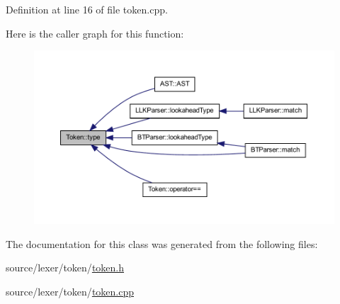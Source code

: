 Definition at line 16 of file token.cpp.



Here is the caller graph for this function:\nopagebreak
\begin{figure}[H]
\begin{center}
\leavevmode
\includegraphics[width=400pt]{class_token_af7a5db637926db45f92522f7bc207207_icgraph}
\end{center}
\end{figure}




The documentation for this class was generated from the following files:\begin{DoxyCompactItemize}
\item 
source/lexer/token/\hyperlink{token_8h}{token.h}\item 
source/lexer/token/\hyperlink{token_8cpp}{token.cpp}\end{DoxyCompactItemize}
